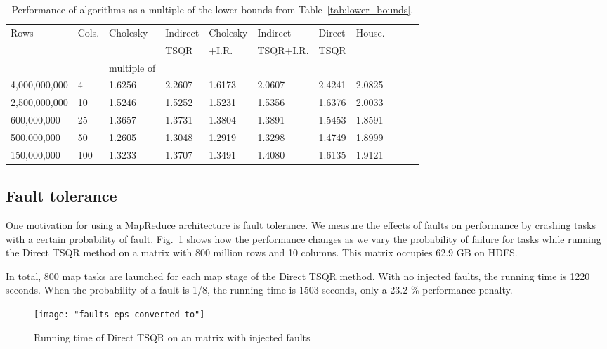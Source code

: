\documentclass[10pt, conference, compsocconf]{IEEEtran}
\begin{document}
\begin{table*}[tbp]
\vspace{-\baselineskip}
\caption{Performance of algorithms as a multiple of the lower bounds from Table~\ref{tab:lower_bounds}.}
\centering
\begin{tabularx}{\linewidth}{llXXXXXXXXX}
\toprule
Rows               & Cols. & Cholesky & Indirect & Cholesky & Indirect         & Direct & House. \\
                          &           &                   & TSQR   & +I.R.         & TSQR+I.R. & TSQR & \\\cmidrule{3-8}
& & multiple of  \\ \midrule
4,000,000,000 & 4 & 1.6256 & 2.2607 & 1.6173 & 2.0607 & 2.4241 & 2.0825 \\
2,500,000,000 & 10 & 1.5246 & 1.5252 & 1.5231 & 1.5356 & 1.6376 & 2.0033 \\
600,000,000    & 25 & 1.3657 & 1.3731 & 1.3804 & 1.3891 & 1.5453 & 1.8591 \\
500,000,000    & 50 & 1.2605 & 1.3048 & 1.2919 & 1.3298 & 1.4749 & 1.8999 \\
150,000,000   & 100 & 1.3233 & 1.3707 & 1.3491 & 1.4080  & 1.6135 & 1.9121 \\
\bottomrule
\end{tabularx}
\label{tab:bound_perf}
\end{table*}


\subsection{Fault tolerance}

One motivation for using a MapReduce architecture is fault tolerance.  We measure the effects of faults on performance by crashing tasks with a certain probability of fault.  Fig.~\ref{fig:faults} shows how the performance changes as we vary the probability of failure for tasks while running the Direct TSQR method on a matrix with 800 million rows and 10 columns.  This matrix occupies 62.9 GB on HDFS.

In total, 800 map tasks are launched for each map stage of the Direct TSQR method.  With no injected faults, the running time is 1220 seconds.  When the probability of a fault is 1/8, the running time is 1503 seconds, only a 23.2 \% performance penalty.

\begin{figure}
\texttt{[image: "faults-eps-converted-to"]}
\caption{Running time of Direct TSQR on an  matrix with injected faults}
\label{fig:faults}
\end{figure}
\end{document}

